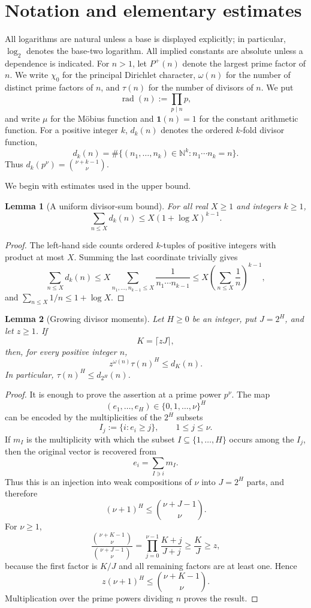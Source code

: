 \documentclass[11pt]{amsart}
\newtheorem{lemma}[lemma]{Lemma}
\theoremstyle{definition}
\theoremstyle{remark}
\numberwithin{equation}{section}
\newcommand{\N}{\mathbb N}
\newcommand{\rad}{\operatorname{rad}}
\newcommand{\mathbfone}{\mathbf 1}
\begin{document}
\section{Notation and elementary estimates}

All logarithms are natural unless a base is displayed explicitly; in
particular, $\log_2$ denotes the base-two logarithm.  All implied constants
are absolute unless a dependence is indicated.  For $n>1$, let $P^+(n)$
denote the largest prime factor of $n$.  We write $\chi_0$ for the principal
Dirichlet character, $\omega(n)$ for the number of distinct prime factors
of $n$, and $\tau(n)$ for the number of divisors of $n$.  We put
\[
 \rad(n):=\prod_{p\mid n}p,
\]
and write $\mu$ for the M\"obius function and $\mathbfone(n)=1$ for the
constant arithmetic function.  For a positive integer $k$, $d_k(n)$
denotes the ordered $k$-fold divisor function,
\[
 d_k(n)=\#\{(n_1,\ldots,n_k)\in\N^k:n_1\cdots n_k=n\}.
\]
Thus $d_k(p^\nu)=\binom{\nu+k-1}{\nu}$.

We begin with estimates used in the upper bound.
\begin{lemma}[A uniform divisor-sum bound]\label{lem:dk-sum}
For all real $X\ge1$ and integers $k\ge1$,
\[
 \sum_{n\le X}d_k(n)\le X(1+\log X)^{k-1}.
\]
\end{lemma}

\begin{proof}
The left-hand side counts ordered $k$-tuples of positive integers with product at most $X$.  Summing the last coordinate trivially gives
\[
 \sum_{n\le X}d_k(n)
 \le X\sum_{n_1,\ldots,n_{k-1}\le X}\frac1{n_1\cdots n_{k-1}}
 \le X\left(\sum_{n\le X}\frac1n\right)^{k-1},
\]
and $\sum_{n\le X}1/n\le1+\log X$.
\end{proof}

\begin{lemma}[Growing divisor moments]\label{lem:local-moment}
Let $H\ge0$ be an integer, put $J=2^H$, and let $z\ge1$.  If
\[
 K=\lceil zJ\rceil,
\]
then, for every positive integer $n$,
\[
 z^{\omega(n)}\tau(n)^H\le d_K(n).
\]
In particular, $\tau(n)^H\le d_{2^H}(n)$.
\end{lemma}

\begin{proof}
It is enough to prove the assertion at a prime power $p^\nu$.  The map
\[
 (e_1,\ldots,e_H)\in\{0,1,\ldots,\nu\}^H
\]
can be encoded by the multiplicities of the $2^H$ subsets
\[
 I_j:=\{i:e_i\ge j\},\qquad 1\le j\le\nu.
\]
If $m_I$ is the multiplicity with which the subset $I\subseteq\{1,\ldots,H\}$ occurs among the $I_j$, then the original vector is recovered from
\[
 e_i=\sum_{I\ni i}m_I.
\]
Thus this is an injection into weak compositions of $\nu$ into $J=2^H$ parts, and therefore
\[
 (\nu+1)^H\le\binom{\nu+J-1}{\nu}.
\]
For $\nu\ge1$,
\[
 \frac{\binom{\nu+K-1}{\nu}}{\binom{\nu+J-1}{\nu}}
 =\prod_{j=0}^{\nu-1}\frac{K+j}{J+j}
 \ge\frac KJ\ge z,
\]
because the first factor is $K/J$ and all remaining factors are at least one.  Hence
\[
 z(\nu+1)^H\le\binom{\nu+K-1}{\nu}.
\]
Multiplication over the prime powers dividing $n$ proves the result.
\end{proof}
\end{document}
